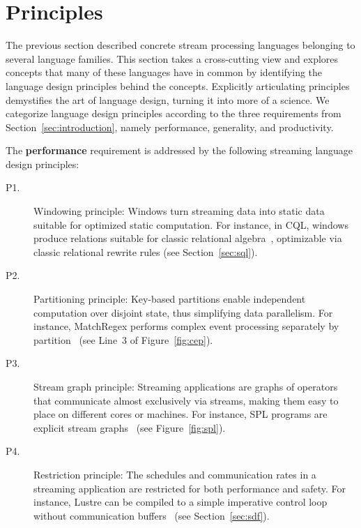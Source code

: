 \section{Principles}\label{sec:principles}

The previous section described concrete stream processing languages
belonging to several language families. This section takes a
cross-cutting view and explores concepts that many of these languages
have in common by identifying the language design principles behind
the concepts.  Explicitly articulating principles demystifies the art
of language design, turning it into more of a science. We categorize
language design principles according to the three requirements from
Section~\ref{sec:introduction}, namely performance, generality, and
productivity.

The \textbf{performance} requirement is addressed by the following streaming
language design principles:
\begin{description}
  \item[P1.] Windowing principle: Windows turn streaming data into static
    data suitable for optimized static computation.  For instance, in
    CQL, windows produce relations suitable for classic relational
    algebra~\cite{arasu_babu_widom_2006}, optimizable via classic relational
    rewrite rules (see Section~\ref{sec:sql}).
  \item[P2.] Partitioning principle: Key-based partitions enable
    independent computation over disjoint state, thus simplifying data
    parallelism. For instance, MatchRegex performs complex event
    processing separately by partition~\cite{hirzel_2012} (see Line~3
    of Figure~\ref{fig:cep}).
  \item[P3.] Stream graph principle: Streaming applications are graphs of
    operators that communicate almost exclusively via streams, making
    them easy to place on different cores or machines. For instance,
    SPL programs are explicit stream
    graphs~\cite{hirzel_schneider_gedik_2017} (see
    Figure~\ref{fig:spl}).
  \item[P4.] Restriction principle: The schedules and communication
    rates in a streaming application are restricted for both
    performance and safety. For instance, Lustre can be compiled to a
    simple imperative control loop without communication
    buffers~\cite{lustre_1987} (see Section~\ref{sec:sdf}).
\end{description}

